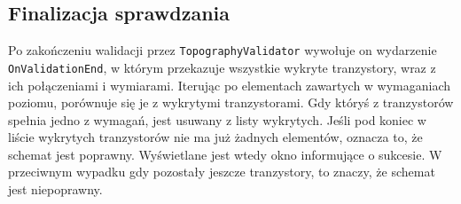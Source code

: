 \subsection{Finalizacja sprawdzania}
\label{subsec:finalizacja_sprawdzania}

Po zakończeniu walidacji przez \texttt{TopographyValidator} wywołuje on wydarzenie \texttt{OnValidationEnd},
w którym przekazuje wszystkie wykryte tranzystory, wraz z ich połączeniami i wymiarami.
Iterując po elementach zawartych w wymaganiach poziomu,
porównuje się je z wykrytymi tranzystorami.
Gdy któryś z tranzystorów spełnia jedno z wymagań, jest usuwany z listy wykrytych.
Jeśli pod koniec w liście wykrytych tranzystorów nie ma już żadnych elementów,
oznacza to, że schemat jest poprawny.
Wyświetlane jest wtedy okno informujące o sukcesie.
W przeciwnym wypadku gdy pozostały jeszcze tranzystory, to znaczy, że schemat jest niepoprawny.